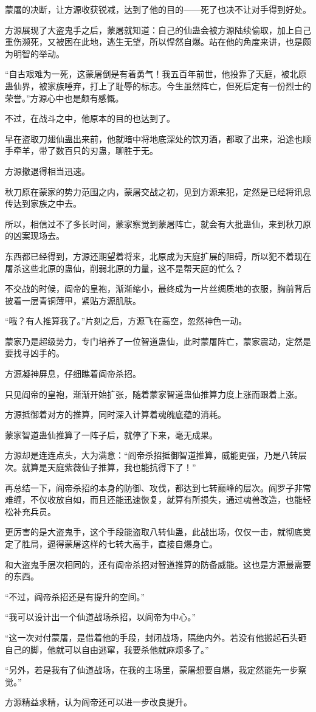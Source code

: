 \begin{this_body}
蒙屠的决断，让方源收获锐减，达到了他的目的——死了也决不让对手得到好处。

方源展现了大盗鬼手之后，蒙屠就知道：自己的仙蛊会被方源陆续偷取，加上自己重伤濒死，又被困在此地，逃生无望，所以悍然自爆。站在他的角度来讲，也是颇为明智的举动。

“自古艰难为一死，这蒙屠倒是有着勇气！我五百年前世，他投靠了天庭，被北原蛊仙界，被家族唾弃，打上了耻辱的标志。今生虽然阵亡，但死后定有一份烈士的荣誉。”方源心中也是颇有感慨。

不过，在战斗之中，他原本的目的也达到了。

早在盗取刀翅仙蛊出来前，他就暗中将地底深处的饮刃酒，都取了出来，沿途也顺手牵羊，带了数百只的刃蛊，聊胜于无。

方源撤退得相当迅速。

秋刀原在蒙家的势力范围之内，蒙屠交战之初，见到方源来犯，定然是已经将讯息传达到家族之中去。

所以，相信过不了多长时间，蒙家察觉到蒙屠阵亡，就会有大批蛊仙，来到秋刀原的凶案现场去。

东西都已经得到，方源还期望着将来，北原成为天庭扩展的阻碍，所以犯不着现在屠杀这些北原的蛊仙，削弱北原的力量，这不是帮天庭的忙么？

不交战的时候，阎帝的皇袍，渐渐缩小，最终成为一片丝绸质地的衣服，胸前背后披着一层青铜薄甲，紧贴方源肌肤。

“哦？有人推算我了。”片刻之后，方源飞在高空，忽然神色一动。

蒙家乃是超级势力，专门培养了一位智道蛊仙，此时蒙屠阵亡，蒙家震动，定然是要找寻凶手的。

方源凝神屏息，仔细瞧着阎帝杀招。

只见阎帝的皇袍，渐渐开始扩张，随着蒙家智道蛊仙推算力度上涨而跟着上涨。

方源抵御着对方的推算，同时深入计算着魂魄底蕴的消耗。

蒙家智道蛊仙推算了一阵子后，就停了下来，毫无成果。

方源却是连连点头，大为满意：“阎帝杀招抵御智道推算，威能更强，乃是八转层次。就算是天庭紫薇仙子推算，我也能抗得下了！”

再总结一下，阎帝杀招的本身的防御、攻伐，都达到七转巅峰的层次。阎罗子非常难缠，不仅收放自如，而且还能迅速恢复，就算有所损失，通过魂兽改造，也能轻松补充兵员。

更厉害的是大盗鬼手，这个手段能盗取八转仙蛊，此战出场，仅仅一击，就彻底奠定了胜局，逼得蒙屠这样的七转大高手，直接自爆身亡。

和大盗鬼手层次相同的，还有阎帝杀招对智道推算的防备威能。这也是方源最需要的东西。

“不过，阎帝杀招还是有提升的空间。”

“我可以设计出一个仙道战场杀招，以阎帝为中心。”

“这一次对付蒙屠，是借着他的手段，封闭战场，隔绝内外。若没有他搬起石头砸自己的脚，他就可以自由逃窜，我要杀他就麻烦多了。”

“另外，若是我有了仙道战场，在我的主场里，蒙屠想要自爆，我定然能先一步察觉。”

方源精益求精，认为阎帝还可以进一步改良提升。

\end{this_body}


